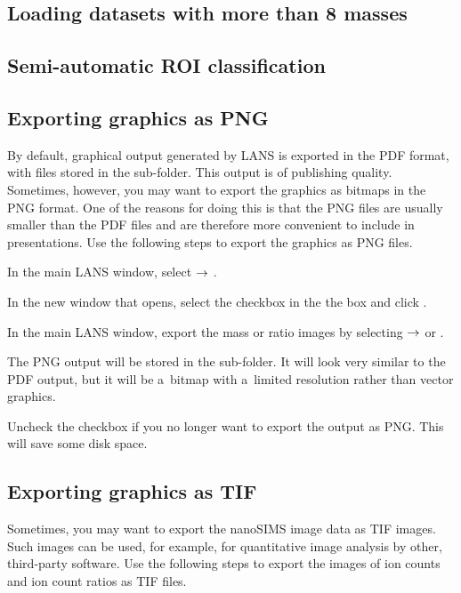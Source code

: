 
\subsection{Loading datasets with more than 8 masses}
\setcounter{step}{0}

\subsection{Semi-automatic ROI classification}
\setcounter{step}{0}


\subsection{Exporting graphics as PNG}
\setcounter{step}{0}

By default, graphical output generated by LANS is exported in the PDF format, with files stored in the  sub-folder. This output is of publishing quality. Sometimes, however, you may want to export the graphics as bitmaps in the PNG format. One of the reasons for doing this is that the PNG files are usually smaller than the PDF files and are therefore more convenient to include in presentations. Use the following steps to export the graphics as PNG files.

\s In the main LANS window, select  $\rightarrow$ .

\s In the new window that opens, select the  checkbox in the the  box and click .

\s In the main LANS window, export the mass or ratio images by selecting  $\rightarrow$  or . 

\bul The PNG output will be stored in the  sub-folder. It will look very similar to the PDF output, but it will be  a~bitmap with a~limited resolution rather than vector graphics.

\s Uncheck the  checkbox if you no longer want to export the output as PNG. This will save some disk space.


\subsection{Exporting graphics as TIF}
\setcounter{step}{0}

Sometimes, you may want to export the nanoSIMS image data as TIF images. Such images can be used, for example, for quantitative image analysis by other, third-party software.  Use the following steps to export the images of ion counts and ion count ratios as TIF files. 

